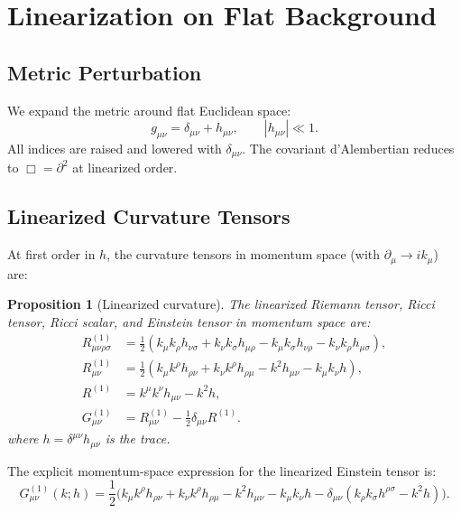 \documentclass[11pt,a4paper]{article}
\theoremstyle{plain}
\newtheorem{proposition}[theorem]{Proposition}
\theoremstyle{definition}
\begin{document}
\section{Linearization on Flat Background}\label{sec:linearize}

\subsection{Metric Perturbation}

We expand the metric around flat Euclidean space:
\begin{equation}\label{eq:metric-pert}
  g_{\mu\nu} = \delta_{\mu\nu} + h_{\mu\nu},
  \qquad |h_{\mu\nu}| \ll 1.
\end{equation}
All indices are raised and lowered with $\delta_{\mu\nu}$.
The covariant d'Alembertian reduces to $\Box = \partial^2$
at linearized order.

\subsection{Linearized Curvature Tensors}

At first order in $h$, the curvature tensors in momentum space
(with $\partial_\mu \to ik_\mu$) are:

\begin{proposition}[Linearized curvature]\label{prop:lin-curv}
The linearized Riemann tensor, Ricci tensor, Ricci scalar,
and Einstein tensor in momentum space are:
\begin{align}
  R^{(1)}_{\mu\nu\rho\sigma} &= \frac{1}{2}(k_\mu k_\rho h_{\nu\sigma}
  + k_\nu k_\sigma h_{\mu\rho}
  - k_\mu k_\sigma h_{\nu\rho}
  - k_\nu k_\rho h_{\mu\sigma}),
  \label{eq:Riem-lin}\\
  R^{(1)}_{\mu\nu} &= \frac{1}{2}(k_\mu k^\rho h_{\rho\nu}
  + k_\nu k^\rho h_{\rho\mu}
  - k^2 h_{\mu\nu} - k_\mu k_\nu h),
  \label{eq:Ric-lin}\\
  R^{(1)} &= k^\mu k^\nu h_{\mu\nu} - k^2 h,
  \label{eq:R-lin}\\
  G^{(1)}_{\mu\nu} &= R^{(1)}_{\mu\nu}
  - \frac{1}{2}\delta_{\mu\nu} R^{(1)}.
  \label{eq:G-lin}
\end{align}
where $h = \delta^{\mu\nu} h_{\mu\nu}$ is the trace.
\end{proposition}

The explicit momentum-space expression for the linearized Einstein
tensor is:
\begin{equation}\label{eq:G-explicit}
  G^{(1)}_{\mu\nu}(k; h) = \frac{1}{2}\Big(
  k_\mu k^\rho h_{\rho\nu} + k_\nu k^\rho h_{\rho\mu}
  - k^2 h_{\mu\nu} - k_\mu k_\nu h
  - \delta_{\mu\nu}(k_\rho k_\sigma h^{\rho\sigma} - k^2 h)
  \Big).
\end{equation}
\end{document}
